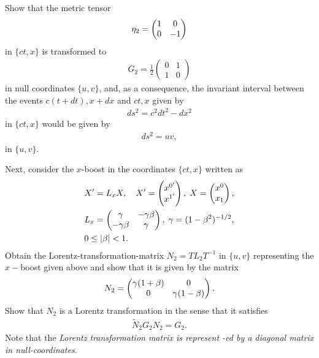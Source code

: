 \begin{small}
\exise Show that the metric tensor
\begin{align}\label{str.75}
{\eta}_2 =\begin{pmatrix} 1 &0\\0 &-1\end{pmatrix}
\end{align}
in  $\{ct,x\}$ is transformed to
\begin{align}\label{str.76}
G_2 = \frac{1}{2}\begin{pmatrix}0 &1\\1 &0\end{pmatrix}
\end{align}
in null coordinates $\{u,v\}$, and, as a consequence, the
invariant interval between the events $ c(t+dt), x+dx $ and
 $ct,x $ given by
\begin{align*} 
ds^2=c^2dt^2 -dx^2
\end{align*} in  $\{ct,x\}$
would be given by
\begin{align} \label{str.77}
ds^2 =uv,
\end{align}
in  $\{u,v\}$.

Next, consider the $x$-boost in the coordinates $\{ct,x\}$
written as
\begin{align}\label{str.78}
&X'=L_x X,\quad X'=\begin{pmatrix}
x^{0'}\\x^{1'}\end{pmatrix} ,\; X=\begin{pmatrix}
x^0\\x_1\end{pmatrix} ,\notag\\ &L_x=\begin{pmatrix} {\gamma}
&-{\gamma}{\beta}\\-{\gamma}{\beta} &{\gamma}\end{pmatrix} ,\;
{\gamma} =(1-{\beta}^2)^{-1/2},\notag\\ &0\leq|{\beta}|< 1.
\end{align}
Obtain the Lorentz-transformation-matrix $ N_2 = TL_2T^{-1} 
$ in $\{u,v\}$ representing the $ x- $boost given above and 
show that it is given by the matrix
\begin{align}\label{str.79}
 N_2=\begin{pmatrix}
{\gamma}(1+{\beta})&0\\0&{\gamma}(1-{\beta})\end{pmatrix} .
\end{align}
Show that $N_2$ is a Lorentz transformation in the sense 
that it satisfies 
\begin{align}\label{str.80} 
\tilde{N}_2 G_2 N_2 = G_2. 
\end{align} 
Note that the \textsl{Lorentz transformation matrix is 
represent  -ed by a diagonal matrix in null-coordinates}.


\end{small}
